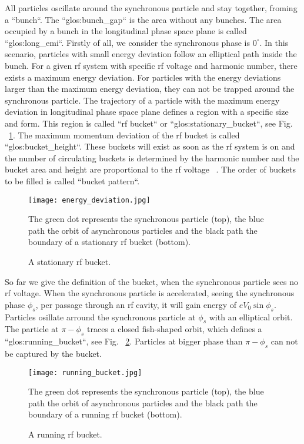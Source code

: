 All particles oscillate around the synchronous particle and stay together, froming a ``bunch``. The ``\gls{glos:bunch_gap}`` is the area without any bunches. The area occupied by a bunch in the longitudinal phase space plane is called ``\gls{glos:long_emi}``. Firstly of all, we consider the synchronous phase is $0^\circ$. In this scenario, particles with small energy deviation follow an elliptical path inside the bunch. For a given rf system with specific rf voltage and harmonic number, there exists a maximum energy deviation. For particles with the energy deviations larger than the maximum energy deviation, they can not be trapped around the synchronous particle. The trajectory of a particle with the maximum energy deviation in longitudinal phase space plane defines a region with a specific size and form. This region is called ``rf bucket`` or ``\gls{glos:stationary_bucket}``, see Fig. ~\ref{energy_deviation}. The maximum momentum deviation of the rf bucket is called ``\gls{glos:bucket_height}``. These buckets will exist as soon as the rf system is on and the number of circulating buckets is determined by the harmonic number and the bucket area and height are proportional to the rf voltage ~\cite{lee_accelerator_2011}. The order of buckets to be filled is called ``bucket pattern``.
\begin{figure}[!htb]
   \centering   
   \texttt{[image: energy\_deviation.jpg]}
   \caption{A stationary rf bucket.}{The green dot represents the synchronous particle (top), the blue path the orbit of asynchronous particles and the black path the boundary of a stationary rf bucket (bottom).}
   \label{energy_deviation}
\end{figure} 

So far we give the definition of the bucket, when the synchronous particle sees no rf voltage. When the synchronous particle is accelerated, seeing the synchronous phase $\phi_{\mathit{s}}$, per passage through an rf cavity, it will gain energy of $eV_0\sin\phi_{\mathit{s}}$. %
Particles osillate arround the synchronous particle at $\phi_{\mathit{s}}$ with an elliptical orbit. The particle at $\pi-\phi_{\mathit{s}}$ traces a closed fish-shaped orbit, which defines a ``\gls{glos:running_bucket}``, see Fig. ~\ref{running_bucket}. Particles at bigger phase than $\pi-\phi_{\mathit{s}}$ can not be captured by the bucket.
\begin{figure}[!htb]
   \centering   
   \texttt{[image: running\_bucket.jpg]}
   \caption{A running rf bucket.}{The green dot represents the synchronous particle (top), the blue path the orbit of asynchronous particles and the black path the boundary of a running rf bucket (bottom).}
   \label{running_bucket}
\end{figure} 

